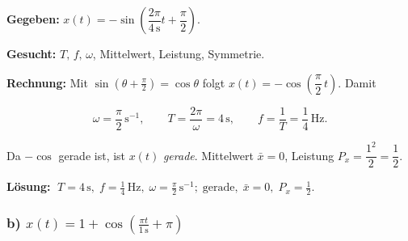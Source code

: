 \begin{beispiel}

\textbf{Gegeben:} $x(t) = -\sin\!\left(\dfrac{2\pi}{4\,\mathrm{s}}t + \dfrac{\pi}{2}\right)$.

\textbf{Gesucht:} $T,\, f,\, \omega$, Mittelwert, Leistung, Symmetrie.

\textbf{Rechnung:} Mit $\sin(\theta + \tfrac{\pi}{2}) = \cos\theta$ folgt
$x(t) = -\cos\!\left(\dfrac{\pi}{2}\,t\right)$. Damit

$$
\omega = \frac{\pi}{2}\,\mathrm{s}^{-1}, \qquad
T = \frac{2\pi}{\omega} = 4\,\mathrm{s}, \qquad
f = \frac{1}{T} = \frac{1}{4}\,\mathrm{Hz}.
$$

Da $-\cos$ gerade ist, ist $x(t)$ \emph{gerade}. Mittelwert $\bar{x} = 0$,
Leistung $P_x = \dfrac{1^2}{2} = \dfrac{1}{2}$.

\begin{center}
\end{center}

\textbf{Lösung:}
$\boxed{\;T = 4\,\mathrm{s},\; f = \tfrac14\,\mathrm{Hz},\;
\omega = \tfrac{\pi}{2}\,\mathrm{s}^{-1};\; \text{gerade},\;
\bar{x} = 0,\; P_x = \tfrac12.\;}$

\end{beispiel}

\subsubsection*{b) $x(t) = 1 + \cos\!\left(\frac{\pi t}{1\,\mathrm{s}} + \pi\right)$}

